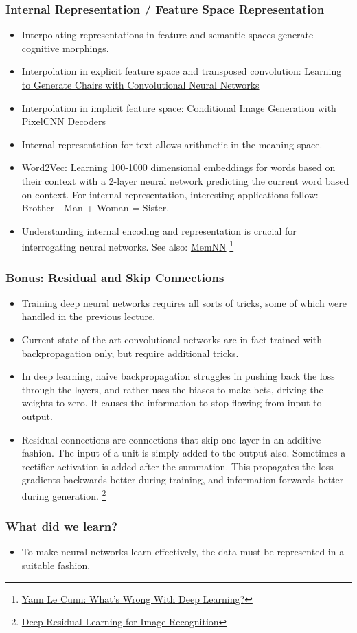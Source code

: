 \documentclass[8pt]{beamer}
\begin{document}
\begin{frame}
\frametitle{Internal Representation / Feature Space Representation}
 \begin{itemize}
  \item Interpolating representations in feature and semantic spaces generate cognitive morphings.
  \item Interpolation in explicit feature space and transposed convolution:
        \href{https://www.youtube.com/watch?v=QCSW4isBDL0}{Learning to Generate Chairs with Convolutional Neural Networks}
  \item Interpolation in implicit feature space:
        \href{https://arxiv.org/abs/1606.05328}{Conditional Image Generation with PixelCNN Decoders}
  \item Internal representation for text allows arithmetic in the meaning space.
  \item \href{http://deeplearning4j.org/word2vec.html}{Word2Vec}: Learning 100-1000 dimensional embeddings for words based on their context with a 2-layer neural network
        predicting the current word based on context. For internal representation, interesting applications follow: Brother - Man + Woman = Sister.
  \item Understanding internal encoding and representation is crucial for interrogating neural networks. See also: \href{http://arxiv.org/pdf/1410.3916v11.pdf}{MemNN}
        \footnote{\href{http://www.pamitc.org/cvpr15/files/lecun-20150610-cvpr-keynote.pdf}{Yann Le Cunn: What's Wrong With Deep Learning?}}
 \end{itemize}
\end{frame}

\begin{frame}
\frametitle{Bonus: Residual and Skip Connections}
 \begin{itemize}
  \item Training deep neural networks requires all sorts of tricks, some of which were handled in the previous lecture.
  \item Current state of the art convolutional networks are in fact trained with backpropagation only, but require additional tricks.
  \item In deep learning, naive backpropagation struggles in pushing back the loss through the layers, and rather uses the biases to make bets, driving the weights to zero.
        It causes the information to stop flowing from input to output.
  \item Residual connections are connections that skip one layer in an additive fashion.
        The input of a unit is simply added to the output also. Sometimes a rectifier activation is added after the summation.
        This propagates the loss gradients backwards better during training, and information forwards better during generation.
        \footnote{\href{https://arxiv.org/abs/1512.03385}{ Deep Residual Learning for Image Recognition}}
 \end{itemize}
\end{frame}

\begin{frame}
\frametitle{What did we learn?}
 \begin{itemize}
  \item To make neural networks learn effectively, the data must be represented in a suitable fashion.
 \end{itemize}
\end{frame}
\end{document}
